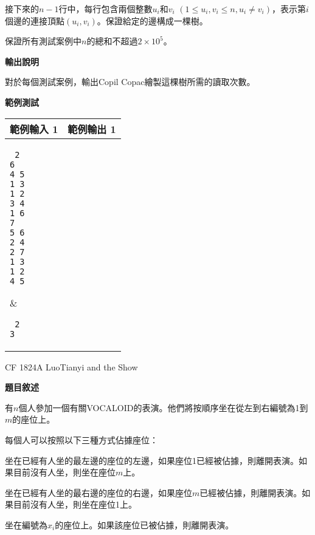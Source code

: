     接下來的$n-1$行中，每行包含兩個整數$u_i$和$v_i$ $(1\le u_i, v_i\le n, u_i\neq v_i)$，表示第$i$個邊的連接頂點$(u_i, v_i)$。保證給定的邊構成一棵樹。

    保證所有測試案例中$n$的總和不超過$2\times 10^5$。

    \textbf{輸出說明}

    對於每個測試案例，輸出Copil Copac繪製這棵樹所需的讀取次數。

    \textbf{範例測試}

    \begin{tabular}{|m{7cm}|m{7cm}|}
        \hline
        範例輸入 1 & 範例輸出 1 \\
        \hline
        \parbox[t]{7cm} %
        { \tt
        2 \\
        6 \\ 
        4 5 \\ 
        1 3 \\ 
        1 2 \\
        3 4 \\ 
        1 6 \\
        7 \\
        5 6 \\
        2 4 \\
        2 7 \\
        1 3 \\ 
        1 2 \\
        4 5 \\        
        } &
        \parbox[t]{7cm}
        { \tt
        2 \\
        3  \\           
        } \\
        \hline
    \end{tabular}

    \problem CF 1824A LuoTianyi and the Show

    \textbf{題目敘述}

    有$n$個人參加一個有關VOCALOID的表演。他們將按順序坐在從左到右編號為1到$m$的座位上。

    每個人可以按照以下三種方式佔據座位：
    
    坐在已經有人坐的最左邊的座位的左邊，如果座位1已經被佔據，則離開表演。如果目前沒有人坐，則坐在座位$m$上。
    
    坐在已經有人坐的最右邊的座位的右邊，如果座位$m$已經被佔據，則離開表演。如果目前沒有人坐，則坐在座位1上。
    
    坐在編號為$x_i$的座位上。如果該座位已被佔據，則離開表演。
    
